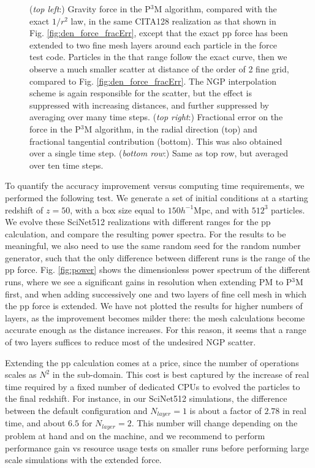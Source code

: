 \documentclass[useAMS,usenatbib]{mn2e}
\begin{document}
\begin{figure}
\begin{center}
    \caption{({\it top left}:) Gravity force in the P$^3$M algorithm, compared with the exact $1/r^{2}$ law,
  in the same CITA128 realization as that shown in Fig. \ref{fig:den_force_fracErr}, 
  except that the exact pp force has been extended to two fine mesh layers around each particle
  in the force test code.
  Particles in the that range follow the exact curve, then we observe a much smaller scatter at 
  distance of the order of 2 fine grid, compared to Fig. \ref{fig:den_force_fracErr}. 
  The NGP interpolation scheme is again responsible for the scatter, but the effect is suppressed with increasing distances, and further suppressed by averaging over many time steps.
  ({\it top right}:) Fractional error on the force in the P$^3$M algorithm, in the radial direction (top) and fractional tangential contribution (bottom).
  This was also obtained over a single time step.
  ({\it bottom row}:) Same as top row, but averaged over ten time steps.
    \label{fig:den_force_fracErr_ppext6}}
\end{center}
\end{figure}

 
 
 To quantify the accuracy improvement versus computing time requirements, we performed the following test.
 We generate a set of initial conditions at a starting redshift of $z = 50$, with a box size equal to $ 150 h^{-1}\mbox{Mpc}$,
 and with $512^{3}$ particles. We evolve these SciNet512 realizations with different ranges for the pp calculation, and compare 
 the resulting power spectra. For the results to be meaningful, we also need to use the same random seed for the random number generator,
 such that the only difference between different runs is the range of the pp force.
 Fig. \ref{fig:power} shows the dimensionless power spectrum of the different runs, where we see a significant gains in resolution
 when extending  PM to P$^{3}$M first, and when adding successively one and two layers of fine cell mesh in which the pp force is extended.
We have not plotted the results for higher numbers of layers, as the improvement becomes milder there: the mesh calculations
become accurate enough as the distance increases. For this reason, it seems that a range of two layers suffices 
to reduce most of the undesired NGP scatter.

Extending the pp calculation comes at a price, since the number of operations scales as  $N^{2}$ in the sub-domain. 
This cost is best captured by the increase of real time required by a fixed number of dedicated  {\small CPU}s 
to evolved the particles to the final redshift. For instance, in our SciNet512 simulations, 
the difference between the default configuration and $N_{layer} = 1$  is about a factor of $2.78$ in real time,
and about $6.5$ for $N_{layer} = 2$.
This number will change depending on the problem at hand and on the machine, and we recommend
to perform performance gain vs resource usage tests on smaller runs before performing large scale simulations
with the extended force.
\end{document}
